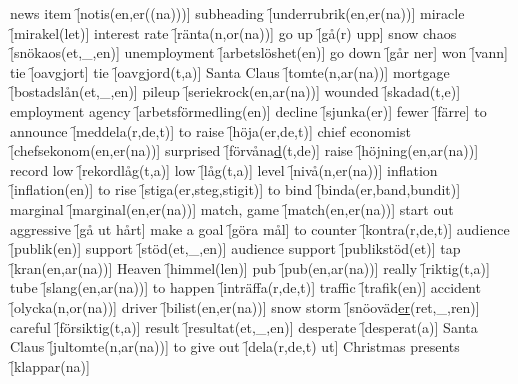 \begin{questions}
    \begin{multicols}{2}
        \raggedcolumns
        \question news item \f[notis(en,er((na)))]
        \question subheading \f[underrubrik(en,er(na))]
        \question miracle \f[mirakel(let)]
        \question interest rate \f[ränta(n,or(na))]
        \question go up \f[gå(r) upp]
        \question snow chaos \f[snökaos(et,\_,en)]
        \question unemployment \f[arbetslöshet(en)]
        \question go down \f[går ner]
        \question won \f[vann]
        \question tie \f[oavgjort]
        \question tie \f[oavgjord(t,a)]
        \question Santa Claus \f[tomte(n,ar(na))]
        \question mortgage \f[bostadslån(et,\_,en)]
        \question pileup \f[seriekrock(en,ar(na))]
        \question wounded \f[skadad(t,e)]
        \question employment agency \f[arbetsförmedling(en)]
        \question decline \f[sjunka(er)]
        \question fewer \f[färre]
        \question to announce \f[meddela(r,de,t)]
        \question to raise \f[höja(er,de,t)]
        \question chief economist \f[chefsekonom(en,er(na))]
        \question surprised \f[förvåna\underline{d}(t,de)]
        \question raise \f[höjning(en,ar(na))]
        \question record low \f[rekordlåg(t,a)]
        \question low \f[låg(t,a)]
        \question level \f[nivå(n,er(na))]
        \question inflation \f[inflation(en)]
        \question to rise \f[stiga(er,steg,stigit)]
        \question to bind \f[binda(er,band,bundit)]
        \question marginal \f[marginal(en,er(na))]
        \question match, game \f[match(en,er(na))]
        \question start out aggressive \f[gå ut hårt]
        \question make a goal \f[göra mål]
        \question to counter \f[kontra(r,de,t)]
        \question audience \f[publik(en)]
        \question support \f[stöd(et,\_,en)]
        \question audience support \f[publikstöd(et)]
        \question tap \f[kran(en,ar(na))]
        \question Heaven \f[himmel(len)]
        \question pub \f[pub(en,ar(na))]
        \question really \f[riktig(t,a)]
        \question tube \f[slang(en,ar(na))]
        \question to happen \f[inträffa(r,de,t)]
        \question traffic \f[trafik(en)]
        \question accident \f[olycka(n,or(na))]
        \question driver \f[bilist(en,er(na))]
        \question snow storm \f[snöoväd\underline{er}(ret,\_,ren)]
        \question careful \f[försiktig(t,a)]
        \question result \f[resultat(et,\_,en)]
        \question desperate \f[desperat(a)]
        \question Santa Claus \f[jultomte(n,ar(na))]
        \question to give out \f[dela(r,de,t) ut]
        \question Christmas presents \f[klappar(na)]

\end{multicols}
\end{questions}

